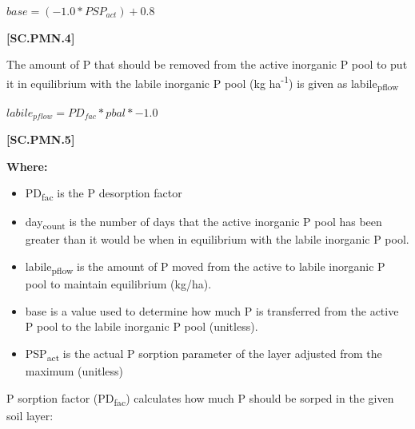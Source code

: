     \begin{center}
\(base= (-1.0*PSP_{act})+0.8	\)
    \end{center}
        \vspace{0.5cm} 
    
            {\raggedleft \textbf{[SC.PMN.4]}\par}
            \vspace{0.5cm}

The amount of P that should be removed from the active inorganic P pool to put it in equilibrium with the labile inorganic P pool (kg ha\textsuperscript{-1}) is given as labile\textsubscript{pflow} 
            \vspace{0.5cm}

    \begin{center}
\(labile_{pflow} = PD_{fac}* pbal * -1.0\)
    \end{center}
        \vspace{0.5cm} 
    
            {\raggedleft \textbf{[SC.PMN.5]}\par}
            \vspace{0.5cm}

        \textbf{Where:}
            
        \begin{itemize}
            \item PD\textsubscript{fac} is the P desorption factor
            \item day\textsubscript{count} is the number of days that the active inorganic P pool has been greater than it would be when in equilibrium with the labile inorganic P pool. 
            \item labile\textsubscript{pflow} is the amount of P moved from the active to labile inorganic P pool to maintain equilibrium (kg/ha).
            \item base is a value used to determine how much P is transferred from the active P pool to the labile inorganic P pool (unitless). 
            \item PSP\textsubscript{act}	is the actual P sorption parameter of the layer adjusted from the maximum (unitless)
        \end{itemize}
        \vspace{0.5cm}

P sorption factor (PD\textsubscript{fac}) calculates how much P should be sorped in the given soil layer:
            \vspace{0.5cm}

